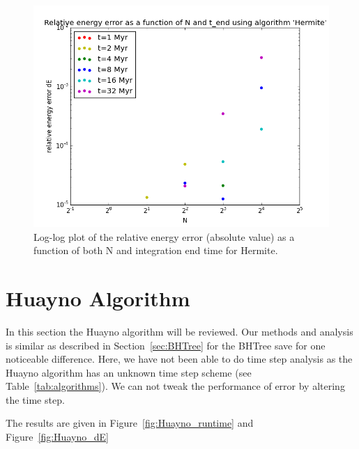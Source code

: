 \documentclass{aa}
\begin{document}
   \begin{figure}
   \centering
   \includegraphics[width=\hsize]{img/CA_GD_TLRH_s1603221_SS_s1617451_Hermite_dE_log.png}
      \caption{Log-log plot of the relative energy error (absolute value) as a function of both N and integration 
               end time for Hermite.
              }
         \label{fig:Hermite_dE}
   \end{figure}

\section{Huayno Algorithm} \label{sec:Huayno}
In this section the Huayno algorithm will be reviewed. Our methods and analysis is similar as described in Section~\ref{sec:BHTree} for the BHTree save for one noticeable difference. Here, we have not been able to do time step analysis as the Huayno algorithm has an unknown time step scheme (see Table~\ref{tab:algorithms}). We can not tweak the performance of error by altering the time step.

The results are given in Figure~\ref{fig:Huayno_runtime} and Figure~\ref{fig:Huayno_dE}
  
\end{document}

